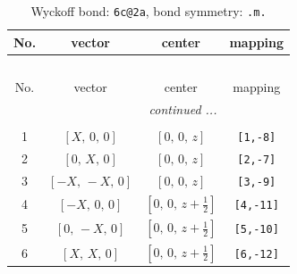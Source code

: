 \documentclass[fleqn,8pt]{jsarticle}
\begin{document}
\begin{longtable}{cccc}
\caption{Wyckoff bond: {\tt 6c@2a}, bond symmetry: {\tt .m.}}
 \\
 \hline \hline
No. & vector & center & mapping \\ \hline \endfirsthead

\multicolumn{3}{l}{\tablename\ \thetable{}} \\
 \hline \hline
No. & vector & center & mapping \\ \hline \endhead

 \hline \hline
\multicolumn{3}{r}{\footnotesize\it continued ...} \\ \endfoot

 \hline \hline
\multicolumn{3}{r}{} \\ \endlastfoot

1 & $\left[ X,\, 0,\, 0 \right]$ & $\left[ 0,\, 0,\, z \right]$ & {\tt [1,-8]} \\ \hline
2 & $\left[ 0,\, X,\, 0 \right]$ & $\left[ 0,\, 0,\, z \right]$ & {\tt [2,-7]} \\ \hline
3 & $\left[ - X,\, - X,\, 0 \right]$ & $\left[ 0,\, 0,\, z \right]$ & {\tt [3,-9]} \\ \hline
4 & $\left[ - X,\, 0,\, 0 \right]$ & $\left[ 0,\, 0,\, z + \frac{1}{2} \right]$ & {\tt [4,-11]} \\ \hline
5 & $\left[ 0,\, - X,\, 0 \right]$ & $\left[ 0,\, 0,\, z + \frac{1}{2} \right]$ & {\tt [5,-10]} \\ \hline
6 & $\left[ X,\, X,\, 0 \right]$ & $\left[ 0,\, 0,\, z + \frac{1}{2} \right]$ & {\tt [6,-12]} \\
\end{longtable}
\renewcommand{\arraystretch}{1.2}
\end{document}
